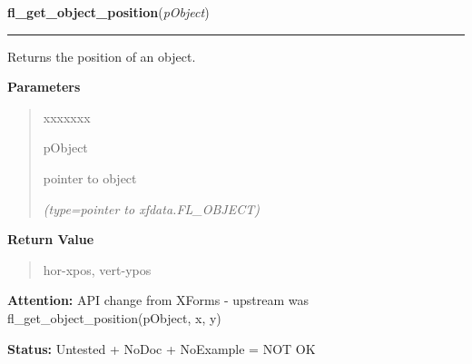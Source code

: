 \hspace{.8\funcindent}\begin{boxedminipage}{\funcwidth}

    \raggedright \textbf{fl\_get\_object\_position}(\textit{pObject})

    \vspace{-1.5ex}

    \rule{\textwidth}{0.5\fboxrule}
\setlength{\parskip}{2ex}
    Returns the position of an object.

\setlength{\parskip}{1ex}
      \textbf{Parameters}
      \vspace{-1ex}

      \begin{quote}
        \begin{Ventry}{xxxxxxx}

          \item[pObject]

          pointer to object

            {\it (type=pointer to xfdata.FL\_OBJECT)}

        \end{Ventry}

      \end{quote}

      \textbf{Return Value}
    \vspace{-1ex}

      \begin{quote}
      hor-xpos, vert-ypos

      \end{quote}

\textbf{Attention:} API change from XForms - upstream was fl\_get\_object\_position(pObject, x,
y)



\textbf{Status:} Untested + NoDoc + NoExample = NOT OK



    \end{boxedminipage}

    \label{xformslib:library:fl_get_object_bbox}

    \vspace{0.5ex}

